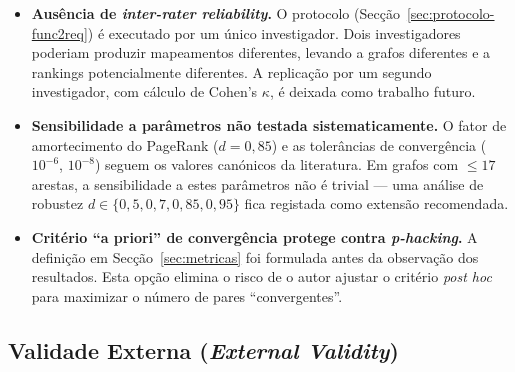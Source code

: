 \begin{itemize}
    \item \textbf{Ausência de \emph{inter-rater reliability}.} O
        protocolo 
        (Secção~\ref{sec:protocolo-func2req}) é executado por um
        único investigador. Dois investigadores poderiam produzir
        mapeamentos diferentes, levando a grafos diferentes e a
        rankings potencialmente diferentes. A replicação por um
        segundo investigador, com cálculo de Cohen's $\kappa$, é
        deixada como trabalho futuro.

    \item \textbf{Sensibilidade a parâmetros não testada
        sistematicamente.} O fator de amortecimento do PageRank
        ($d = 0{,}85$) e as tolerâncias de convergência ($10^{-6}$,
        $10^{-8}$) seguem os valores canónicos da literatura. Em
        grafos com $\leq 17$ arestas, a sensibilidade a estes
        parâmetros não é trivial --- uma análise de robustez
        $d \in \{0{,}5, 0{,}7, 0{,}85, 0{,}95\}$ fica registada como
        extensão recomendada.

    \item \textbf{Critério ``a priori'' de convergência protege
        contra \emph{p-hacking}.} A definição em
        Secção~\ref{sec:metricas} foi formulada antes da observação
        dos resultados. Esta opção elimina o risco de o autor
        ajustar o critério \emph{post hoc} para maximizar o número
        de pares ``convergentes''.
\end{itemize}

\subsection{Validade Externa (\emph{External Validity})}

